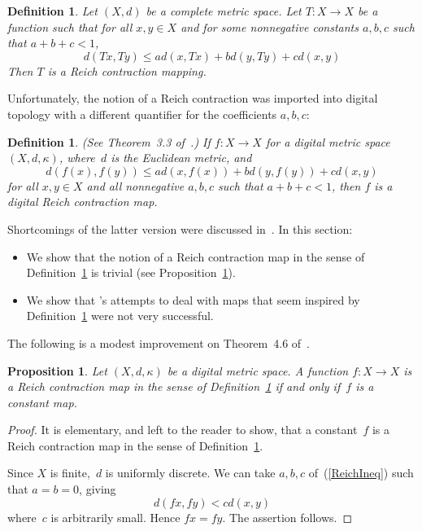 \documentclass{article}
\newtheorem{prop}[thm]{Proposition}
\newtheorem{definition}[thm]{Definition}
\numberwithin{thm}{section}
\begin{document}
\begin{definition}
\label{realReich}
    {\rm \cite{Reich}}
    Let $(X,d)$ be a complete
    metric space. Let 
    $T: X \to X$ be a function
    such that for all 
    $x,y \in X$ and for some 
    nonnegative constants 
    $a,b,c$ such that
    $a+b+c < 1$,    \begin{equation}
    \label{ReichOrig}
    d(Tx,Ty) \le ad(x,Tx) +
    bd(y,Ty) + cd(x,y)    
    \end{equation}
    Then $T$ is a
{\em Reich contraction mapping}.
\end{definition}

Unfortunately, the notion of
a Reich contraction was 
imported into digital topology
with a different quantifier for the
coefficients $a,b,c$:

\begin{definition}
\label{ReichDef}
{\rm (See Theorem~3.3 of~\cite{ParkEtAl}.)} If $f: X \to X$ for a digital 
metric space $(X, d, \kappa)$, 
where~$d$ is the Euclidean metric, and
\begin{equation}
\label{ReichIneq}
    d(f(x),f(y)) \le ad(x, f(x)) + bd(y, f(y)) + cd(x, y)
\end{equation}
          for all $x,y \in X$ and all nonnegative $a,b,c$ such that
          $a+b+c < 1$, then $f$ is a {\em digital Reich contraction map}.
\end{definition}
Shortcomings of the latter
version were discussed
in~\cite{BxSt19}. 
In this section:
\begin{itemize}
    \item We show that
the notion of a Reich 
contraction map in the sense of
Definition~\ref{ReichDef}
is trivial (see
Proposition~\ref{ReichTriv}).
\item We show that
\cite{OkAk}'s attempts to
deal with maps that seem
inspired by Definition~\ref{ReichDef}
were not very successful.
\end{itemize}

The following is a modest
improvement on Theorem~4.6
of~\cite{BxSt19}.

\begin{prop}
    \label{ReichTriv}
    Let $(X,d,\kappa)$ be a digital metric space. A
    function $f: X \to X$ is a Reich contraction map 
    in the sense of Definition~\ref{ReichDef} if 
    and only if~$f$ is a constant map.
\end{prop}

\begin{proof}
It is elementary, and left to the reader to show,
that a constant~$f$ is a Reich contraction map 
    in the sense of Definition~\ref{ReichDef}.
    
Since $X$ is finite,~$d$ is uniformly discrete.
We can take $a,b,c$ of~(\ref{ReichIneq})
such that $a=b=0$, giving
\[ d(fx,fy) < c d(x,y)
\]
where~$c$ is arbitrarily small.
Hence $fx=fy$. The assertion follows.
\end{proof}
\end{document}
